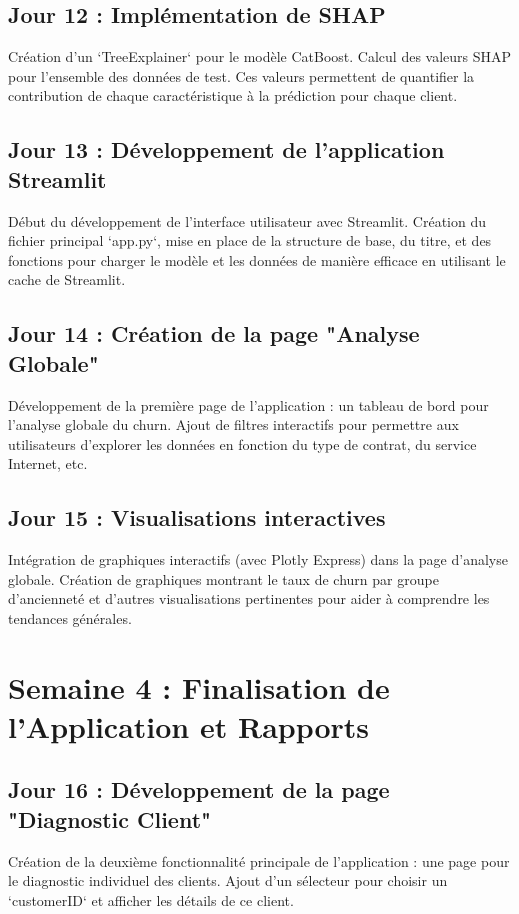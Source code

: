 \documentclass[11pt, a4paper]{report}
\begin{document}
\section{Jour 12 : Implémentation de SHAP}
Création d'un `TreeExplainer` pour le modèle CatBoost. Calcul des valeurs SHAP pour l'ensemble des données de test. Ces valeurs permettent de quantifier la contribution de chaque caractéristique à la prédiction pour chaque client.

\section{Jour 13 : Développement de l'application Streamlit}
Début du développement de l'interface utilisateur avec Streamlit. Création du fichier principal `app.py`, mise en place de la structure de base, du titre, et des fonctions pour charger le modèle et les données de manière efficace en utilisant le cache de Streamlit.

\section{Jour 14 : Création de la page "Analyse Globale"}
Développement de la première page de l'application : un tableau de bord pour l'analyse globale du churn. Ajout de filtres interactifs pour permettre aux utilisateurs d'explorer les données en fonction du type de contrat, du service Internet, etc.

\section{Jour 15 : Visualisations interactives}
Intégration de graphiques interactifs (avec Plotly Express) dans la page d'analyse globale. Création de graphiques montrant le taux de churn par groupe d'ancienneté et d'autres visualisations pertinentes pour aider à comprendre les tendances générales.

\chapter{Semaine 4 : Finalisation de l'Application et Rapports}
\section{Jour 16 : Développement de la page "Diagnostic Client"}
Création de la deuxième fonctionnalité principale de l'application : une page pour le diagnostic individuel des clients. Ajout d'un sélecteur pour choisir un `customerID` et afficher les détails de ce client.
\end{document}
